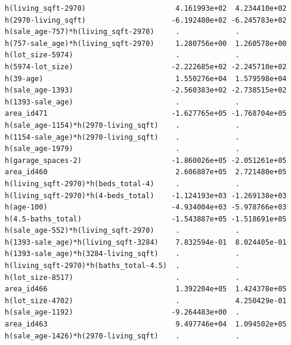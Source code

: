\documentclass[
]{article}
\begin{document}
\begin{verbatim}
h(living_sqft-2970)                     4.161993e+02  4.234410e+02
h(2970-living_sqft)                    -6.192480e+02 -6.245783e+02
h(sale_age-757)*h(living_sqft-2970)     .             .           
h(757-sale_age)*h(living_sqft-2970)     1.280756e+00  1.260578e+00
h(lot_size-5974)                        .             .           
h(5974-lot_size)                       -2.222685e+02 -2.245710e+02
h(39-age)                               1.550276e+04  1.579598e+04
h(sale_age-1393)                       -2.560383e+02 -2.738515e+02
h(1393-sale_age)                        .             .           
area_id471                             -1.627765e+05 -1.768704e+05
h(sale_age-1154)*h(2970-living_sqft)    .             .           
h(1154-sale_age)*h(2970-living_sqft)    .             .           
h(sale_age-1979)                        .             .           
h(garage_spaces-2)                     -1.860026e+05 -2.051261e+05
area_id460                              2.606887e+05  2.721480e+05
h(living_sqft-2970)*h(beds_total-4)     .             .           
h(living_sqft-2970)*h(4-beds_total)    -1.124193e+03 -1.269138e+03
h(age-100)                             -4.934004e+03 -5.978766e+03
h(4.5-baths_total)                     -1.543887e+05 -1.518691e+05
h(sale_age-552)*h(living_sqft-2970)     .             .           
h(1393-sale_age)*h(living_sqft-3284)    7.832594e-01  8.024405e-01
h(1393-sale_age)*h(3284-living_sqft)    .             .           
h(living_sqft-2970)*h(baths_total-4.5)  .             .           
h(lot_size-8517)                        .             .           
area_id466                              1.392204e+05  1.424378e+05
h(lot_size-4702)                        .             4.250429e-01
h(sale_age-1192)                       -9.264483e+00  .           
area_id463                              9.497746e+04  1.094502e+05
h(sale_age-1426)*h(2970-living_sqft)    .             .           
                                                                  

\end{verbatim}
\end{document}
